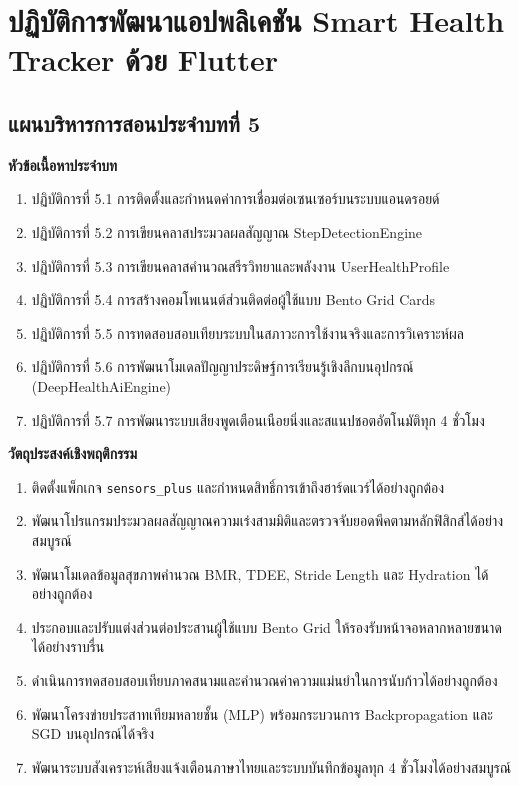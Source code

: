 \chapter{ปฏิบัติการพัฒนาแอปพลิเคชัน Smart Health Tracker ด้วย Flutter}
\label{chap:ch05}

\section*{แผนบริหารการสอนประจำบทที่ 5}

\noindent\textbf{หัวข้อเนื้อหาประจำบท}
\begin{enumerate}
    \item ปฏิบัติการที่ 5.1 การติดตั้งและกำหนดค่าการเชื่อมต่อเซนเซอร์บนระบบแอนดรอยด์
    \item ปฏิบัติการที่ 5.2 การเขียนคลาสประมวลผลสัญญาณ StepDetectionEngine
    \item ปฏิบัติการที่ 5.3 การเขียนคลาสคำนวณสรีรวิทยาและพลังงาน UserHealthProfile
    \item ปฏิบัติการที่ 5.4 การสร้างคอมโพเนนต์ส่วนติดต่อผู้ใช้แบบ Bento Grid Cards
    \item ปฏิบัติการที่ 5.5 การทดสอบสอบเทียบระบบในสภาวะการใช้งานจริงและการวิเคราะห์ผล
    \item ปฏิบัติการที่ 5.6 การพัฒนาโมเดลปัญญาประดิษฐ์การเรียนรู้เชิงลึกบนอุปกรณ์ (DeepHealthAiEngine)
    \item ปฏิบัติการที่ 5.7 การพัฒนาระบบเสียงพูดเตือนเนือยนิ่งและสแนปชอตอัตโนมัติทุก 4 ชั่วโมง
\end{enumerate}

\noindent\textbf{วัตถุประสงค์เชิงพฤติกรรม}
\begin{enumerate}
    \item ติดตั้งแพ็กเกจ \texttt{sensors\_plus} และกำหนดสิทธิ์การเข้าถึงฮาร์ดแวร์ได้อย่างถูกต้อง
    \item พัฒนาโปรแกรมประมวลผลสัญญาณความเร่งสามมิติและตรวจจับยอดพีคตามหลักฟิสิกส์ได้อย่างสมบูรณ์
    \item พัฒนาโมเดลข้อมูลสุขภาพคำนวณ BMR, TDEE, Stride Length และ Hydration ได้อย่างถูกต้อง
    \item ประกอบและปรับแต่งส่วนต่อประสานผู้ใช้แบบ Bento Grid ให้รองรับหน้าจอหลากหลายขนาดได้อย่างราบรื่น
    \item ดำเนินการทดสอบสอบเทียบภาคสนามและคำนวณค่าความแม่นยำในการนับก้าวได้อย่างถูกต้อง
    \item พัฒนาโครงข่ายประสาทเทียมหลายชั้น (MLP) พร้อมกระบวนการ Backpropagation และ SGD บนอุปกรณ์ได้จริง
    \item พัฒนาระบบสังเคราะห์เสียงแจ้งเตือนภาษาไทยและระบบบันทึกข้อมูลทุก 4 ชั่วโมงได้อย่างสมบูรณ์
\end{enumerate}


